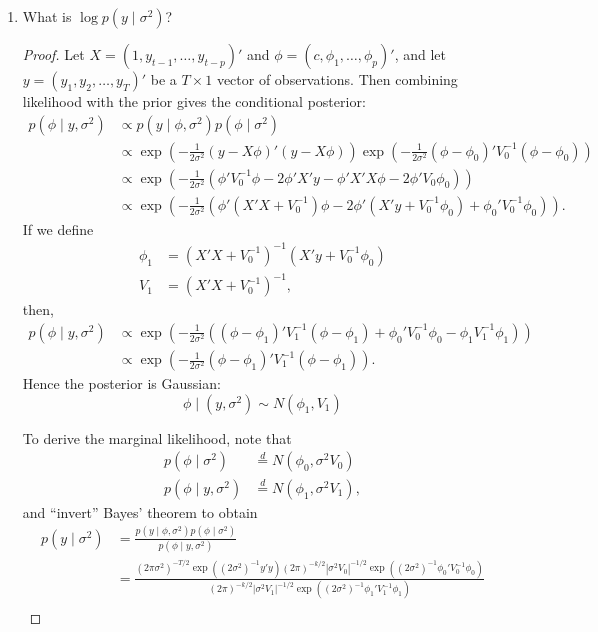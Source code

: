 \documentclass[oneside,reqno]{amsart}
\theoremstyle{definition}
\begin{document}
\begin{enumerate}
\item
What is $\log p(y \mid \sigma^2)$? 

\begin{proof}
Let $X = (1,y_{t-1},\dotsc,y_{t-p})'$ and $\phi = (c, \phi_1,\dotsc,\phi_p)'$, and let $y = (y_1, y_2,\dotsc,y_T)'$ be a $T \times 1$ vector of observations. Then combining likelihood with the prior gives the conditional posterior:
\begin{align*}
	p(\phi \mid y, \sigma^2) &\propto p(y \mid \phi, \sigma^2) p(\phi \mid \sigma^2) \\
	& \propto \exp\left( -\frac{1}{2\sigma^2}(y - X \phi)' (y - X \phi) \right)
	\exp\left(-\frac{1}{2 \sigma^2} (\phi - \phi_0)'  V_0^{-1} (\phi - \phi_0)\right) \\
	&\propto\exp\left(-\frac{1}{2 \sigma^2} ( \phi' V_0^{-1}\phi - 2 \phi' X'y - \phi' X'X \phi - 2 \phi' V_0 \phi_0)\right) \\
	&\propto \exp\left(-\frac{1}{2 \sigma^2} (\phi'(X'X + V_0^{-1}) \phi - 2 \phi'( X'y+ V_0^{-1} \phi_0)+ \phi_0' V_0^{-1} \phi_0 )\right).
\end{align*}
If we define 
\begin{align*}
	\phi_1 &= (X'X + V_0^{-1})^{-1}(X'y +  V_0^{-1} \phi_0) \\
	V_1 &= (X'X + V_0^{-1})^{-1},
\end{align*}
then,
\begin{align*}
	p(\phi \mid y, \sigma^2) &\propto \exp\left(-\frac{1}{2 \sigma^2} \left((\phi - \phi_1)'V_1^{-1}(\phi-\phi_1) + \phi_0'V_0^{-1}\phi_0 - \phi_1V_1^{-1}\phi_1 \right)\right) \\
	&\propto \exp\left(-\frac{1}{2 \sigma^2} (\phi - \phi_1)'V_1^{-1}(\phi-\phi_1)\right).
\end{align*}
Hence the posterior is Gaussian:
\[
	\phi \mid (y, \sigma^2) \sim N(\phi_1, V_1)
\]
\par
To derive the marginal likelihood, note that
\begin{align*}
	p(\phi\mid \sigma^2)  &\overset{d}{=} N(\phi_0, \sigma^2  V_0) \\
	p(\phi\mid y, \sigma^2) &\overset{d}{=} N(\phi_1, \sigma^2  V_1),
\end{align*}
and ``invert'' Bayes' theorem to obtain
\begin{align*}
	 p(y \mid \sigma^2)  & = \frac{p(y \mid \phi, \sigma^2) p(\phi \mid \sigma^2)}{p(\phi \mid y, \sigma^2)}\\
	&= \frac{(2\pi \sigma^2)^{-T/2} \exp((2 \sigma^2)^{-1} y'y) (2\pi)^{-k/2}  |\sigma^2  V_0 |^{-1/2}  \exp((2 \sigma^2)^{-1}  \phi_0'   V_0^{-1} \phi_0)}{ (2\pi)^{-k/2} |\sigma^2  V_1 |^{-1/2} \exp((2 \sigma^2)^{-1} \phi_1'   V_1^{-1}  \phi_1)} \\

\end{align*}
\end{proof}
\end{enumerate}
\end{document}
